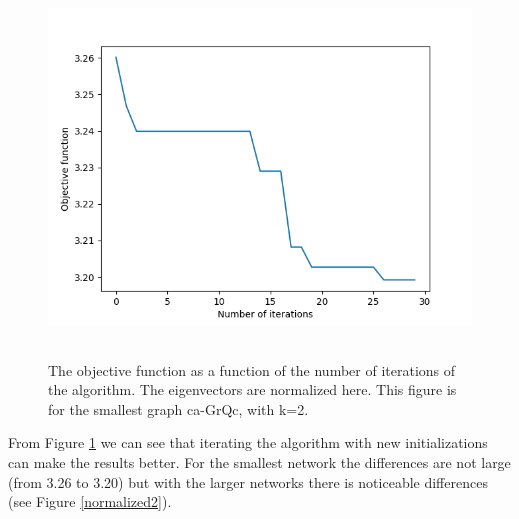 \documentclass{article}
\begin{document}
\begin{figure}[htb]

\begin{center} 
\includegraphics[height=10cm]{plot2.png}
\end{center}
\caption{The objective function as a function of the number of iterations of the algorithm.
The eigenvectors are normalized here. This figure is for the smallest graph ca-GrQc, with k=2.}
\label{plot1}
\end{figure}

From Figure \ref{plot1} we can see that iterating the algorithm with
new initializations can make the results better. For the smallest
network the differences are not large (from 3.26 to 3.20) but with the
larger networks there is noticeable differences (see Figure \ref{normalized2}).
\end{document}
